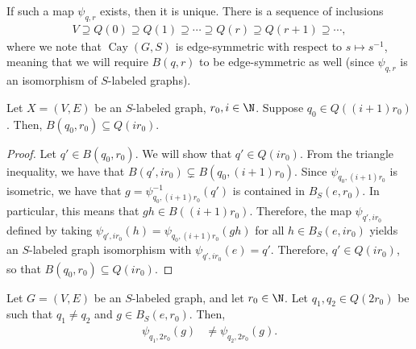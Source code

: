 \documentclass[10pt]{mypackage}
\begin{document}
If such a map $\psi_{q,r}$ exists, then it is unique. There is a sequence of inclusions
\begin{align*}
  V \supseteq Q(0)\supseteq Q(1)\supseteq\cdots\supseteq Q(r)\supseteq Q(r+1)\supseteq\cdots,
\end{align*}
where we note that $\operatorname{Cay}\left( G,S \right)$ is edge-symmetric with respect to $s\mapsto s^{-1}$, meaning that we will require $B\left( q,r \right)$ to be edge-symmetric as well (since $\psi_{q,r}$ is an isomorphism of $S$-labeled graphs).
\begin{lemma}
  Let $X = \left( V,E \right)$ be an $S$-labeled graph, $r_0,i\in \N$. Suppose $q_0\in Q\left( \left( i+1 \right)r_0 \right)$. Then, $B\left( q_0,r_0 \right)\subseteq Q\left( ir_0 \right)$.
\end{lemma}
\begin{proof}
  Let $q'\in B\left( q_0,r_0 \right)$. We will show that $q'\in Q\left( ir_0 \right)$. From the triangle inequality, we have that $B\left( q',ir_0 \right)\subsetneq B\left( q_0,\left( i+1 \right)r_0 \right)$. Since $\psi_{q_0,\left( i+1 \right)r_0}$ is isometric, we have that $g = \psi_{q_0,\left( i+1 \right)r_0}^{-1}\left( q' \right)$ is contained in $B_S\left( e,r_0 \right)$. In particular, this means that $gh\in B\left( \left( i+1 \right)r_0 \right)$. Therefore, the map $\psi_{q',ir_0}$ defined by taking $\psi_{q',ir_0}(h) = \psi_{q_0,\left( i+1 \right)r_0}(gh)$ for all $h\in B_S\left( e,ir_0 \right)$ yields an $S$-labeled graph isomorphism with $\psi_{q',ir_0}(e) = q'$. Therefore, $q'\in Q\left( ir_0 \right)$, so that $B\left( q_0,r_0 \right)\subseteq Q\left( ir_0 \right)$.
\end{proof}
\begin{lemma}
  Let $G = \left( V,E \right)$ be an $S$-labeled graph, and let $r_0\in \N$. Let $q_1,q_2\in Q\left( 2r_0 \right)$ be such that $q_1\neq q_2$ and $g\in B_S\left(e, r_0 \right)$. Then,
  \begin{align*}
    \psi_{q_1,2r_0}(g) &\neq \psi_{q_2,2r_0}(g).
  \end{align*}
\end{lemma}
\end{document}
